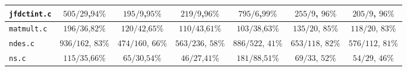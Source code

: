 \begin{tabular}{ |l| |c|c|c|c| |c|c| }
  \\\hline
  \verb|jfdctint.c|
  & \hspace{.5em}$  505/29$,\hspace{.5em}$94\%$ & $  195/9$,\hspace{1em}$95\%$ & \hspace{.5em}$   219/9$,\hspace{1em}$96\%$ & \hspace{.5em}$   795/6$,\hspace{1em}$99\%$
& \hspace{.5em}$255/9$,     \hspace{1em}$96\%$ & \hspace{.5em}$205/9$,     \hspace{1em}$96\%$

  \\\hline
  \verb|matmult.c|
  & \hspace{.5em}$  196/36$,\hspace{.5em}$82\%$ & $ 120/42$,\hspace{.5em}$65\%$ & \hspace{.5em}$  110/43$,\hspace{.5em}$61\%$ & \hspace{.5em}$  103/38$,\hspace{.5em}$63\%$
& \hspace{.5em}$135/20$,    \hspace{.5em}$85\%$ & \hspace{.5em}$118/20$,    \hspace{.5em}$83\%$

  \\\hline
  \verb|ndes.c|
  & \hspace{.5em}$ 936/162$, $83\%$ & $474/160$, $66\%$ & \hspace{.5em}$ 563/236$, $58\%$ & \hspace{.5em}$ 886/522$, $41\%$
& \hspace{.5em}$653/118$,                 $82\%$ & \hspace{.5em}$576/112$,                 $81\%$

  \\\hline
  \verb|ns.c|
  & \hspace{.5em}$  115/35$,\hspace{.5em}$66\%$ & \hspace{.5em}$  65/30$,\hspace{.5em}$54\%$ & \hspace{1em}$   46/27$,\hspace{.5em}$41\%$ & \hspace{.5em}$  181/88$,\hspace{.5em}$51\%$
& \hspace{1em}$69/33$,     \hspace{.5em}$52\%$ & \hspace{1em}$54/29$,     \hspace{.5em}$46\%$


\end{tabular}
